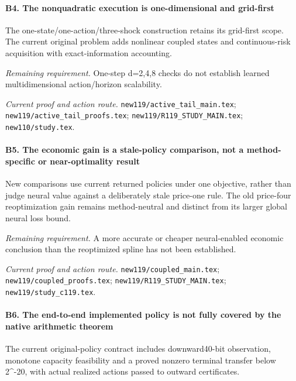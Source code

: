 \paragraph{B4. The nonquadratic execution is one-dimensional and grid-first}

The one-state/\allowbreak{}one-action/\allowbreak{}three-shock construction retains its grid-first scope. The current original problem adds nonlinear coupled states and continuous-risk acquisition with exact-information accounting.

\par\emph{Remaining requirement.} One-step d=2,4,8 checks do not establish learned multidimensional action/\allowbreak{}horizon scalability.

\par\emph{Current proof and action route.} \nolinkurl{new119/active_tail_main.tex}; \nolinkurl{new119/active_tail_proofs.tex}; \nolinkurl{new119/R119_STUDY_MAIN.tex}; \nolinkurl{new110/study.tex}.

\paragraph{B5. The economic gain is a stale-policy comparison, not a method-specific or near-optimality result}

New comparisons use current returned policies under one objective, rather than judge neural value against a deliberately stale price-one rule. The old price-four reoptimization gain remains method-neutral and distinct from its larger global neural loss bound.

\par\emph{Remaining requirement.} A more accurate or cheaper neural-enabled economic conclusion than the reoptimized spline has not been established.

\par\emph{Current proof and action route.} \nolinkurl{new119/coupled_main.tex}; \nolinkurl{new119/coupled_proofs.tex}; \nolinkurl{new119/R119_STUDY_MAIN.tex}; \nolinkurl{new119/study_c119.tex}.

\paragraph{B6. The end-to-end implemented policy is not fully covered by the native arithmetic theorem}

The current original-policy contract includes downward40-bit observation, monotone capacity feasibility and a proved nonzero terminal transfer below 2\textasciicircum{}-20, with actual realized actions passed to outward certificates.

